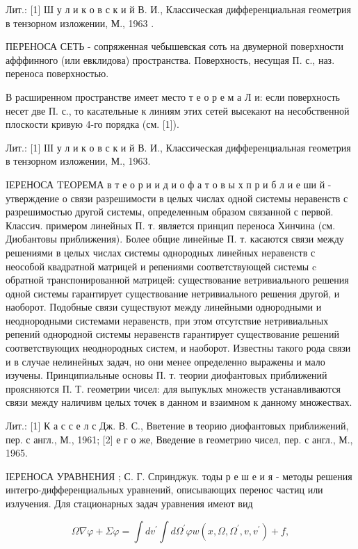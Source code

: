 \documentclass[10pt]{article}
\begin{document}
Лит.: [1] Ш у л и к о в с к и й В. И., Классическая дифференциальная геометрия в тензорном изложении, М., 1963 .

ПЕРЕНОСА СЕТЬ - сопряженная чебышевская соть на двумерной поверхности афффинного (или евклидова) пространства. Поверхность, несущая П. с., наз. переноса поверхностью.

В расширенном пространстве имеет место т е о р е м а Л и: если поверхность несет две П. с., то касательные к линиям этих сетей высекают на несобственной плоскости кривую 4-го порядка (см. [1]).

Лит.: [1] ІІІ у л и к о в с к и й В. И., Классическая дифференциальная геометрия в тензорном изложении, М., 1963.

IЕРЕНОСА TЕОРЕМА в т е о р и и д и о ф а т о в ы х п р и б л и е ши й - утверждение о связи разрешимости в целых числах одной системы неравенств с разрешимостью другой системы, определенным образом связанной с первой. Классич. примером линейных П. т. является принцип переноса Хинчина (см. Диобантовы приближения). Более общие линейные П. т. касаются связи между решениями в целых числах системы однородных линейных неравенств с неособой квадратной матрицей и репениями соответствующей системы $\mathrm{c}$ обратной транспонированной матрицей: существование ветривиального решения одной системы гарантирует существование нетривиального решения другой, и наоборот. Подобные связи существуют между линейными однородными и неоднородными системами неравенств, при этом отсутствие нетривиальных репений однородной системы неравенств гарантирует существование решений соответствующих неоднородных систем, и наоборот. Известны такого рода связи и в случае нелинейных задач, но они менее определенно выражены и мало изучены. Принципиальные основы П. т. теории диофантовых приближений проясняются П. Т. геометрии чисел: для выпуклых множеств устанавливаются связи между наличивм целых точек в данном и взаимном к данному множествах.

Лит.: [1] К а с с е л с Дж. В. С., Вветение в теорию диофантовых приближений, пер. с англ., М., 1961; [2] е г о же, Введение в геометрию чисел, пер. с англ., М., 1965.

IЕРЕНОСА УРАВНЕНИЯ ; С. Г. Спринджук. тоды р е ш е и я - методы решения интегро-дифференциальных уравнений, описывающих перенос частиц или излучения. Для стационарных задач уравнения имеют вид

\[
\Omega \nabla \varphi+\Sigma \varphi=\int d v^{\prime} \int d \Omega^{\prime} \varphi w\left(x, \Omega, \Omega^{\prime}, v, v^{\prime}\right)+f,
\]
\end{document}
